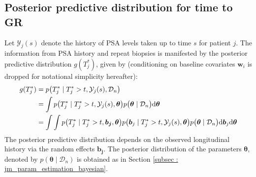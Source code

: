 
\subsection{Posterior predictive distribution for time to GR}
\label{subsec : ppd_time_to_GR}
Let $\mathcal{Y}_j(s)$ denote the history of PSA levels taken up to time $s$ for patient $j$. The information from PSA history and repeat biopsies is manifested by the posterior predictive distribution $g(T^*_j)$, given by (conditioning on baseline covariates $\boldsymbol{w}_i$ is dropped for notational simplicity hereafter):
\begin{equation}
\label{eq : dyn_dist_fail_time}
\begin{split}
g(T^*_j) &= p\big(T^*_j \mid T^*_j > t, \mathcal{Y}_j(s), \mathcal{D}_n\big)\\
&= \int p\big(T^*_j \mid T^*_j > t, \mathcal{Y}_j(s), \boldsymbol{\theta}\big) p\big(\boldsymbol{\theta} \mid \mathcal{D}_n\big) \rmn{d} \boldsymbol{\theta}\\
&= \int \int p\big(T^*_j \mid T^*_j > t, \boldsymbol{b_j}, \boldsymbol{\theta}\big) p\big(\boldsymbol{b}_j \mid T^*_j>t, \mathcal{Y}_j(s), \boldsymbol{\theta}\big)p\big(\boldsymbol{\theta} \mid \mathcal{D}_n\big) \rmn{d} \boldsymbol{b}_j \rmn{d} \boldsymbol{\theta}
\end{split}
\end{equation}
The posterior predictive distribution depends on the observed longitudinal history via the random effects $\boldsymbol{b_j}$. The posterior distribution of the parameters $\boldsymbol{\theta}$, denoted by $p(\boldsymbol{\theta} \mid \mathcal{D}_n)$ is obtained as in Section \ref{subsec : jm_param_estimation_bayesian}.